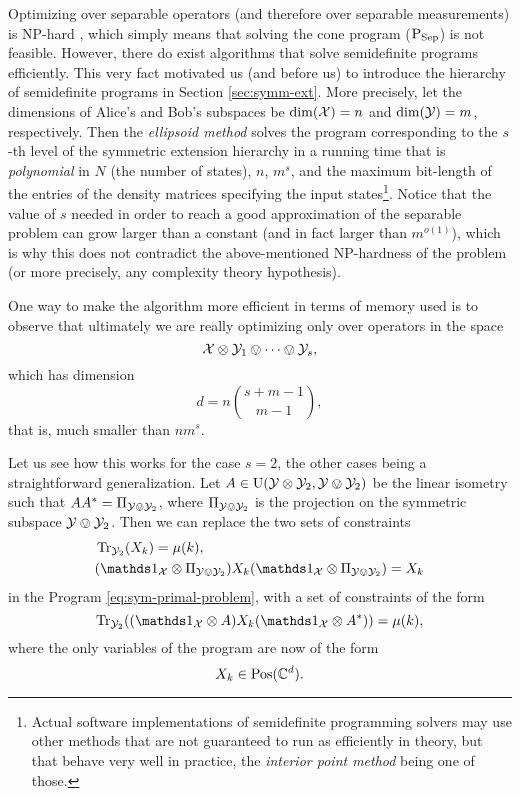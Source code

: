 Optimizing over separable operators (and therefore over separable measurements) is \mbox{NP-hard} \cite{Gharibi10}, 
which simply means that solving the cone program ($\textup{P}_{\mathrm{Sep}}$) is not feasible.
However, there do exist algorithms that solve semidefinite programs efficiently.
This very fact motivated us (and \cite{Doherty04} before us) to introduce the hierarchy of semidefinite programs 
in Section \ref{sec:symm-ext}.
More precisely, let the dimensions of Alice's and Bob's subspaces be $\dim(\mathcal{X}) = n$ and
$\dim(\mathcal{Y}) = m$, respectively. Then the \emph{ellipsoid method} \cite{MartinGroetschel93} 
solves the program corresponding to the $s$-th level of the symmetric extension hierarchy
in a running time that is \emph{polynomial} in $N$ (the number of states), $n$, $m^{s}$, 
and the maximum bit-length of the entries of the density matrices specifying the 
input states\footnote{Actual software implementations of semidefinite programming
solvers may use other methods that are not guaranteed to run as efficiently in theory, 
but that behave very well in practice, the \emph{interior point method} being one of those.}.
Notice that the value of $s$ needed in order to reach a good approximation 
of the separable problem can grow larger than a constant (and in fact larger than $m^{o(1)}$), 
which is why this does not contradict the above-mentioned NP-hardness of the problem (or more precisely, 
any complexity theory hypothesis).

One way to make the algorithm more efficient in terms of memory used is to observe that 
ultimately we are really optimizing only over operators in the space
\begin{equation}
  \mathcal{X}\otimes\mathcal{Y}_{1}\ovee\cdots\ovee\mathcal{Y}_{s},
\end{equation}
which has dimension 
\begin{equation}
 d = n\binom{s+m-1}{m-1},
\end{equation}
that is, much smaller than $nm^{s}$. 

Let us see how this works for the case $s=2$, the other cases being
a straightforward generalization.  
Let $A \in \mathrm{U}(\mathcal{Y}\otimes\mathcal{Y}_{2},\mathcal{Y}\ovee\mathcal{Y}_{2})$ be the linear isometry such 
that $AA^{\ast} = \Pi_{\mathcal{Y}\ovee\mathcal{Y}_{2}}$, where 
$\Pi_{\mathcal{Y}\ovee\mathcal{Y}_{2}}$ is the projection on the symmetric subspace
$\mathcal{Y}\ovee\mathcal{Y}_{2}$.
Then we can replace the two sets of constraints
\begin{equation}
\begin{aligned}
  &\tr_{\Y_{2}}(X_{k}) = \mu(k),\\
  &(\I_{\X}\otimes \Pi_{\Y\ovee\Y_{2}})X_{k}
          (\I_{\X}\otimes \Pi_{\Y\ovee\Y_{2}}) = X_{k}
\end{aligned}
\end{equation}
in the Program \eqref{eq:sym-primal-problem}, with a set of constraints of the form
\begin{equation}
  \tr_{\Y_{2}}((\I_{\X}\otimes A)X_{k}(\I_{\X}\otimes A^{\ast})) = \mu(k),
\end{equation}
where the only variables of the program are now of the form
\begin{equation}
  X_{k}\in\mathrm{Pos}(\mathbb{C}^{d}).
\end{equation}

